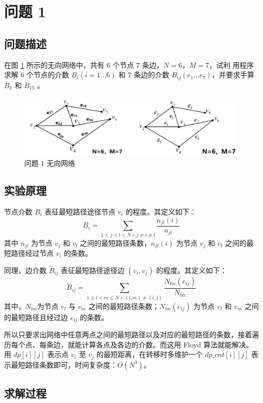 \documentclass{article}
\date{10/02/2022}
\begin{document}
\makecover

\section{问题 1}

\subsection{问题描述}

在图 \ref{fig:1} 所示的无向网络中，共有 $6$ 个节点 $7$ 条边，$N=6$，$M=7$，试利 用程序求解 $6$ 个节点的介数 $B_i(i=1\ldots 6)$ 和 $7$ 条边的介数 $B_{ij}(e_1\ldots e_7)$，并要求手算 $B_1$ 和 $B_{15}$ 。

\begin{figure}[ht]
    \label{fig:1}
    \centering
    \includegraphics[width=.7\textwidth]{fig1.png}
    \caption{问题 1 无向网络}
\end{figure}

\subsection{实验原理}

节点介数 $B_i$ 表征最短路径途径节点 $v_i$ 的程度。其定义如下：
$$
B_i = \sum_{1\leq j < l \leq N \wedge j\neq i\neq l}\frac{n_{jl}(i)}{n_{jl}}
$$
其中 $n_{jl}$ 为节点 $v_j$ 和 $v_l$ 之间的最短路径条数，$n_{jl}(i)$ 为节点 $v_j$ 和 $v_l$ 之间的最短路径经过节点 $v_i$ 的条数。

同理，边介数 $\tilde{B}_{ij}$ 表征最短路径途径边 $(v_i,v_j)$ 的程度。其定义如下：
$$
\tilde{B}_{ij}=\sum_{1\leq l < m \leq N \wedge (l,m)\neq (i,j)}\frac{N_{lm}(e_{ij})}{N_{lm}}
$$
其中，$N_{lm}$为节点 $v_l$ 与 $v_m$ 之间的最短路径条数；$N_{lm}(e_{ij})$ 为节点 $v_l$ 和 $v_m$ 之间的最短路径且经过边 $e_{ij}$ 的条数。

所以只要求出网络中任意两点之间的最短路径以及对应的最短路径的条数，接着遍历每个点、每条边，就能计算各点及各边的介数。而这用 Floyd 算法就能解决。用 $dp[i][j]$ 表示点 $v_i$ 至 $v_j$ 的最短距离，在转移时多维护一个 $dp\_cnt[i][j]$ 表示最短路径条数即可，时间复杂度：$O(N^3)$。

\subsection{求解过程}
\end{document}
